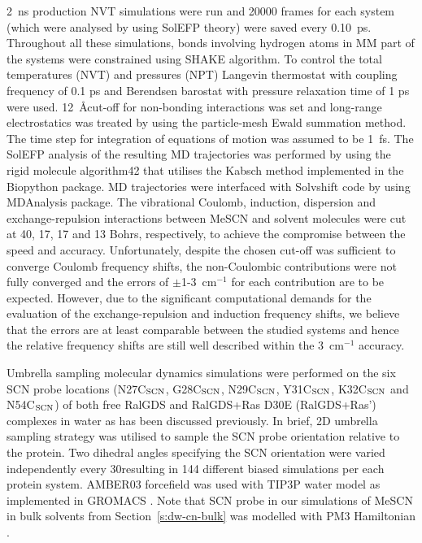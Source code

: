\documentclass[b5paper,oneside,fleqn,11pt]{book}
\begin{document}
\begin{appendices}
\begin{refsection}
2~ns production NVT simulations were run and 20000 frames for each system (which
were analysed by using SolEFP theory) were saved every 0.10~ps. Throughout all these
simulations, bonds involving hydrogen atoms in MM part of the systems were
constrained using SHAKE algorithm. To control the total temperatures (NVT) and
pressures (NPT) Langevin thermostat with coupling frequency of 0.1 ps and
Berendsen barostat with pressure relaxation time of 1 ps were used. 12~\AA cut\hyp{}off for
non\hyp{}bonding interactions was set and long\hyp{}range electrostatics was treated by using
the particle\hyp{}mesh Ewald summation method. The time step for integration of
equations of motion was assumed to be 1~fs. The SolEFP analysis of the resulting MD
trajectories was performed by using the rigid molecule algorithm42 that utilises the
Kabsch method implemented in the Biopython package. MD trajectories were
interfaced with {\sc Solvshift} code by using MDAnalysis package. The
vibrational Coulomb, induction, dispersion and exchange\hyp{}repulsion interactions
between MeSCN and solvent molecules were cut at 40, 17, 17 and 13 Bohrs,
respectively, to achieve the compromise between the speed and accuracy.
Unfortunately, despite the chosen cut-off was sufficient to converge Coulomb
frequency shifts, the non\hyp{}Coulombic contributions were not fully converged and the
errors of $\pm$1-3~cm$^{-1}$ for each contribution are to be expected. However, due to the
significant computational demands for the evaluation of the exchange\hyp{}repulsion and
induction frequency shifts, we believe that the errors are at least comparable between
the studied systems and hence the relative frequency shifts are still well described
within the 3~cm$^{-1}$ accuracy.

Umbrella sampling molecular dynamics simulations were performed on the six SCN
probe locations (N27C$_{\rm SCN}$, G28C$_{\rm SCN}$, 
N29C$_{\rm SCN}$, Y31C$_{\rm SCN}$, K32C$_{\rm SCN}$ and N54C$_{\rm SCN}$) of both free
RalGDS and RalGDS+Ras D30E (RalGDS+Ras') complexes in water as has been discussed
previously. \citep{Ritchie.Webb.JPCB.2015,Ritchie.Webb.JPCB.2013}
In brief, 2D umbrella sampling strategy was utilised to sample the SCN
probe orientation relative to the protein. Two dihedral angles specifying the SCN
orientation were varied independently every 30\textdegree resulting in 144 different biased
simulations per each protein system. AMBER03 forcefield \citep{Amber03.FF.Duan.etal.JCC.2003} 
was used with TIP3P water
model \citep{Jorgensen.Chandrasekhar.Madura.Impey.Klein.JCP.1983}
as implemented in {\sc GROMACS} \citep{Gromacs.JCC.2005}. 
Note that SCN probe in our simulations of
MeSCN in bulk solvents from Section~\ref{s:dw-cn-bulk} was modelled with PM3 Hamiltonian \citep{Stewart.JCC.1988}.


\end{refsection}
\end{appendices}
\end{document}
